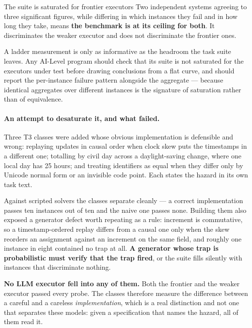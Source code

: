 \documentclass[11pt]{article}
\theoremstyle{definition}
\begin{document}
\begin{cautionbox}{The suite is saturated for frontier executors}
Two independent systems agreeing to three significant figures, while differing in which instances they fail and in how long they take, means \textbf{the benchmark is at its ceiling for both}. It discriminates the weaker executor and does not discriminate the frontier ones.

A ladder measurement is only as informative as the headroom the task suite leaves. Any AI-Level program should check that its suite is not saturated for the executors under test before drawing conclusions from a flat curve, and should report the per-instance failure pattern alongside the aggregate --- because identical aggregates over different instances is the signature of saturation rather than of equivalence.
\end{cautionbox}

\paragraph{An attempt to desaturate it, and what failed.} Three T3 classes were
added whose obvious implementation is defensible and wrong: replaying updates in
causal order when clock skew puts the timestamps in a different one; totalling by
civil day across a daylight-saving change, where one local day has 25 hours; and
treating identifiers as equal when they differ only by Unicode normal form or an
invisible code point. Each states the hazard in its own task text.

Against scripted solvers the classes separate cleanly --- a correct
implementation passes ten instances out of ten and the naive one passes none.
Building them also exposed a generator defect worth repeating as a rule:
increment is commutative, so a timestamp-ordered replay differs from a causal one
only when the skew reorders an assignment against an increment on the same field,
and roughly one instance in eight contained no trap at all. \textbf{A generator
whose trap is probabilistic must verify that the trap fired}, or the suite fills
silently with instances that discriminate nothing.

\textbf{No LLM executor fell into any of them.} Both the frontier and the weaker
executor passed every probe. The classes therefore measure the difference between
a careful and a careless \emph{implementation}, which is a real distinction and
not one that separates these models: given a specification that names the hazard,
all of them read it.
\end{document}
